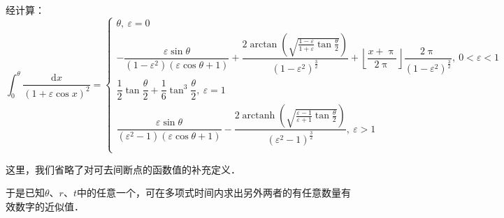 \documentclass[UTF8,fontset=none,linespread=1.2]{ctexart}
\DeclareMathOperator{\arctanh}{arctanh}
\newcommand{\upd}{\mathrm{d}}
\begin{document}
经计算：$$\int_0^{\theta}\dfrac{\upd x}{(1+\varepsilon\cos x)^2}=\left\lbrace\begin{array}{l}
\theta,\ \varepsilon=0\\
-\dfrac{\varepsilon\sin\theta}{(1-\varepsilon^2)(\varepsilon\cos\theta+1)}+\dfrac{2\arctan\left(\sqrt{\frac{1-\varepsilon}{1+\varepsilon}\tan\frac\theta2}\right)}{(1-\varepsilon^2)^{\frac32}}+\left\lfloor\dfrac{x+\uppi}{2\uppi}\right\rfloor\dfrac{2\uppi}{(1-\varepsilon^2)^{\frac32}},\ 0<\varepsilon<1\\
\dfrac12\tan\dfrac\theta2+\dfrac16\tan^3\dfrac\theta2,\ \varepsilon=1\\
\dfrac{\varepsilon\sin\theta}{(\varepsilon^2-1)(\varepsilon\cos\theta+1)}-\dfrac{2\arctanh\left(\sqrt{\frac{\varepsilon-1}{\varepsilon+1}\tan\frac\theta2}\right)}{(\varepsilon^2-1)^{\frac32}},\ \varepsilon>1\\
\end{array}\right.$$

这里，我们省略了对可去间断点的函数值的补充定义．

于是已知$\theta$、$r$、$t$中的任意一个，可在多项式时间内求出另外两者的有任意数量有效数字的近似值．
\end{document}
